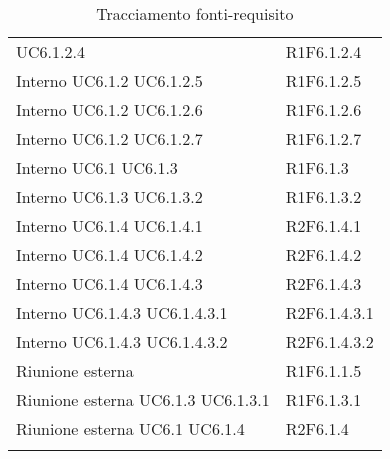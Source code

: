 \begin{longtable}{p{2.5cm}!{\VRule[1pt]}p{2.5cm}}
 \newline UC6.1.2.4
 & R1F6.1.2.4 \\
Interno \newline UC6.1.2
 \newline UC6.1.2.5
 & R1F6.1.2.5 \\
Interno \newline UC6.1.2
 \newline UC6.1.2.6
 & R1F6.1.2.6 \\
Interno \newline UC6.1.2
 \newline UC6.1.2.7
 & R1F6.1.2.7 \\
Interno \newline UC6.1
 \newline UC6.1.3
 & R1F6.1.3 \\
Interno \newline UC6.1.3
 \newline UC6.1.3.2
 & R1F6.1.3.2 \\
Interno \newline UC6.1.4
 \newline UC6.1.4.1
 & R2F6.1.4.1 \\
Interno \newline UC6.1.4
 \newline UC6.1.4.2
 & R2F6.1.4.2 \\
Interno \newline UC6.1.4
 \newline UC6.1.4.3
 & R2F6.1.4.3 \\
Interno \newline UC6.1.4.3
 \newline UC6.1.4.3.1
 & R2F6.1.4.3.1 \\
Interno \newline UC6.1.4.3
 \newline UC6.1.4.3.2
 & R2F6.1.4.3.2 \\
Riunione esterna & R1F6.1.1.5 \\
Riunione esterna \newline UC6.1.3
 \newline UC6.1.3.1
 & R1F6.1.3.1 \\
Riunione esterna \newline UC6.1
 \newline UC6.1.4
 & R2F6.1.4 \\
\caption{Tracciamento fonti-requisito}
\end{longtable}